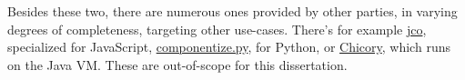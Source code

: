 Besides these two, there are numerous ones provided by other parties, in varying degrees of completeness, targeting other use-cases. There's for example \href{https://github.com/bytecodealliance/jco}{jco}, specialized for JavaScript, \href{https://github.com/bytecodealliance/componentize-py}{componentize.py}, for Python, or \href{https://github.com/dylibso/chicory}{Chicory}, which runs on the Java \gls{VM}. These are out-of-scope for this dissertation.
